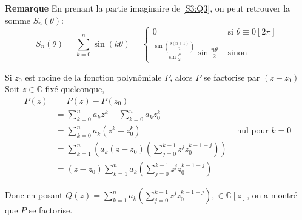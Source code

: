 \documentclass{article}
\renewenvironment{question_kholle}[2][ ]
{
	\subsection{\texorpdfstring{#2}{}}
	\notblank{#1}
	{
		\noindent #1
		\bigbreak
	}
	{}
	\begin{proof}
}
{
	\end{proof}
}
\begin{document}
\textbf{Remarque}
En prenant la partie imaginaire de \eqref{S3:Q3}, on peut retrouver la somme $S_n(\theta)$:
$$
  S_{n}(\theta)= \sum_{k=0}^n \sin(k \theta) = \left\{ \begin{array}{ll}
    0                                                                                             & \text{ si } \theta \equiv 0 [2 \pi] \\
    \frac{\sin\left( \frac{\theta(n+1)}{2} \right)}{\sin \frac{\theta}{2}} \sin \frac{n\theta}{2} & \text{ sinon}
  \end{array}\right.
$$
\begin{question_kholle}
  [{Soient $n \in \mathbb{N}, (a_{0}, \dots, a_{n})\in\mathbb{C}^{n+1}$ et $z_{0} \in \mathbb{C}$ Posons pour tout $z \in \mathbb{C}, P(z) = \sum_{k=0}^{n}a_{k}z^{k}$
  \begin{propositions}
    \item Si $P(z_{0}) = 0$, alors $\exists Q \in\mathbb{C}[z]:\forall z \in \mathbb{C}, P(z)=(z-z_{0})Q(z)$
  \end{propositions}
  }]
  {Si $z_0$ est racine de la fonction polynômiale $P$, alors $P$ se factorise par $(z-z_0)$}
  Soit $z \in \mathbb{C}$ fixé quelconque,
  \begin{align*}
    P(z) & = P(z) - P(z_{0})                                                                                                        \\
         & = \sum_{k=0}^{n}a_{k}z^{k} - \sum_{k=0}^{n}a_{k}z_{0}^{k}                                                                \\
         & = \sum_{k=0}^{n}a_{k}(z^{k}-z_{0}^{k})                                                          & \text{ nul pour }k = 0 \\
         & = \sum_{k=1}^{n}\left( a_{k}(z-z_{0})\left( \sum _{j=0}^{k-1}z^{j}z_{0}^{k-1-j} \right) \right)                          \\
         & = (z-z_{0}) \sum_{k=1}^{n}a_{k}\left( \sum _{j=0}^{k-1}z^{j}z_{0}^{k-1-j} \right)
  \end{align*}

  Donc en posant $Q(z) = \sum_{k=1}^{n}a_{k}\left( \sum _{j=0}^{k-1}z^{j}z_{0}^{k-1-j} \right), \in \mathbb{C}[z]$, on a montré que $P$ se factorise.
\end{question_kholle}
\end{document}
